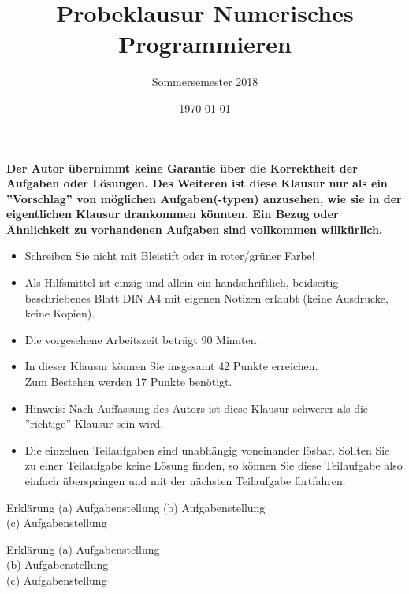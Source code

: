 \documentclass{scrartcl}
\begin{document}
\title{Probeklausur Numerisches Programmieren}
\subtitle{Sommersemester 2018}
\author{\npauthor{}}
\date{\today}
\maketitle

\textbf{Der Autor übernimmt keine Garantie über die Korrektheit der Aufgaben oder Lösungen. \n Des Weiteren ist diese Klausur nur als ein ''Vorschlag'' von möglichen Aufgaben(-typen) anzusehen, wie sie in der eigentlichen Klausur drankommen könnten. Ein Bezug oder Ähnlichkeit zu vorhandenen Aufgaben sind vollkommen willkürlich.}
\sbreak

\begin{itemize}
	\item Schreiben Sie nicht mit Bleistift oder in roter/grüner Farbe!
	\item Als Hilfsmittel ist einzig und allein ein handschriftlich, beidseitig beschriebenes Blatt DIN A4 mit eigenen Notizen erlaubt (keine Ausdrucke, keine Kopien).
	\item Die vorgesehene Arbeitszeit beträgt 90 Minuten
	\item In dieser Klausur können Sie insgesamt 42 Punkte erreichen. \\Zum Bestehen werden 17 Punkte benötigt.
	\item Hinweis: Nach Auffassung des Autors ist diese Klausur schwerer als die ''richtige'' Klausur sein wird.
	\item Die einzelnen Teilaufgaben sind unabhängig voneinander lösbar.
	Sollten Sie zu einer Teilaufgabe keine Lösung finden, so können Sie diese Teilaufgabe also einfach überspringen und mit der nächsten Teilaufgabe fortfahren.
\end{itemize}

	Erklärung
	(a) 
	Aufgabenstellung
	\lbreak \lbreak \lbreak
	(b) 
	Aufgabenstellung
	\lbreak \lbreak \lbreak
	\\
	(c) 
	Aufgabenstellung
	

	Erklärung
	(a)
	Aufgabenstellung
	\lbreak \lbreak \lbreak \lbreak
	\\
	(b)
	Aufgabenstellung
	\lbreak \lbreak \lbreak
	\\
	(c) 
	Aufgabenstellung
\end{document}
